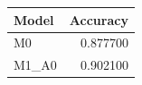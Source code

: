 \begin{tabular}{lr}
\toprule
Model & Accuracy \\
\midrule
M0 & 0.877700 \\
M1_A0 & 0.902100 \\
\bottomrule
\end{tabular}
